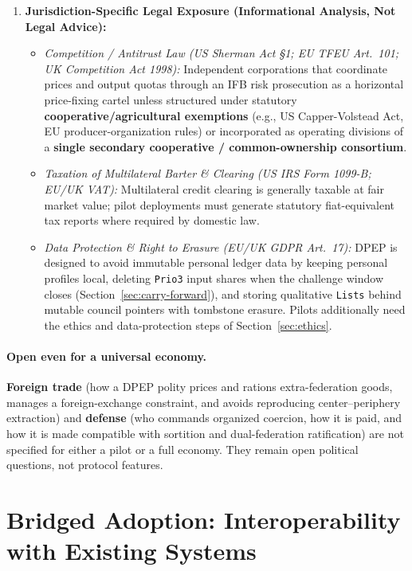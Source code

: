 \documentclass[10pt,twoside,openany]{book}
\theoremstyle{dpepstyle}
\begin{document}
\begin{enumerate}[leftmargin=1.8em,itemsep=3pt]
  \item \textbf{Jurisdiction-Specific Legal Exposure (Informational Analysis, Not Legal Advice):}
  \begin{itemize}[leftmargin=1.4em,itemsep=1pt]
    \item \emph{Competition / Antitrust Law (US Sherman Act \S 1; EU TFEU Art.\ 101; UK Competition Act 1998):} Independent corporations that coordinate prices and output quotas through an IFB risk prosecution as a horizontal price-fixing cartel unless structured under statutory \textbf{cooperative/agricultural exemptions} (e.g., US Capper-Volstead Act, EU producer-organization rules) or incorporated as operating divisions of a \textbf{single secondary cooperative / common-ownership consortium}.
    \item \emph{Taxation of Multilateral Barter \& Clearing (US IRS Form 1099-B; EU/UK VAT):} Multilateral credit clearing is generally taxable at fair market value; pilot deployments must generate statutory fiat-equivalent tax reports where required by domestic law.
    \item \emph{Data Protection \& Right to Erasure (EU/UK GDPR Art.\ 17):} DPEP is designed to avoid immutable personal ledger data by keeping personal profiles local, deleting \texttt{Prio3} input shares when the challenge window closes (Section~\ref{sec:carry-forward}), and storing qualitative \texttt{Lists} behind mutable council pointers with tombstone erasure. Pilots additionally need the ethics and data-protection steps of Section~\ref{sec:ethics}.
  \end{itemize}
\end{enumerate}

\paragraph{Open even for a universal economy.}
\textbf{Foreign trade} (how a DPEP polity prices and rations extra-federation goods, manages a foreign-exchange constraint, and avoids reproducing center--periphery extraction) and \textbf{defense} (who commands organized coercion, how it is paid, and how it is made compatible with sortition and dual-federation ratification) are not specified for either a pilot or a full economy. They remain open political questions, not protocol features.

\section{Bridged Adoption: Interoperability with Existing Systems}
\label{sec:interop}
\end{document}
